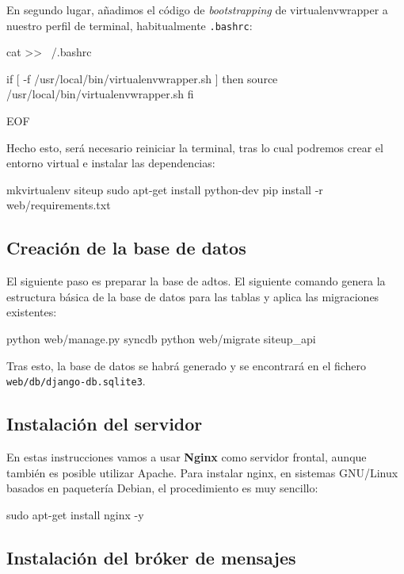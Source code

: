 En segundo lugar, añadimos el código de \textit{bootstrapping} de
virtualenvwrapper a nuestro perfil de terminal, habitualmente \texttt{.bashrc}:

\begin{bashcode}
cat >> ~/.bashrc

if [ -f /usr/local/bin/virtualenvwrapper.sh ]
then
    source /usr/local/bin/virtualenvwrapper.sh
fi

EOF
\end{bashcode}

Hecho esto, será necesario reiniciar la terminal, tras lo cual podremos crear el
entorno virtual e instalar las dependencias:

\begin{bashcode}
mkvirtualenv siteup
sudo apt-get install python-dev
pip install -r web/requirements.txt 
\end{bashcode}

\subsection{Creación de la base de datos}

El siguiente paso es preparar la base de adtos. El siguiente comando genera la
estructura básica de la base de datos para las tablas y aplica las migraciones
existentes:

\begin{bashcode}
python web/manage.py syncdb
python web/migrate siteup_api  
\end{bashcode}

Tras esto, la base de datos se habrá generado y se encontrará en el fichero\\
\texttt{web/db/django-db.sqlite3}.

\subsection{Instalación del servidor}

En estas instrucciones vamos a usar \textbf{Nginx} como servidor frontal, aunque
también es posible utilizar Apache. Para instalar nginx, en sistemas GNU/Linux
basados en paquetería Debian, el procedimiento es muy sencillo:

\begin{bashcode}
sudo apt-get install nginx -y
\end{bashcode}

\subsection{Instalación del bróker de mensajes}

